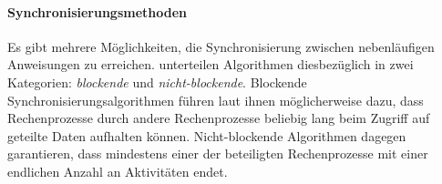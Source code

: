 \paragraph{Synchronisierungsmethoden} Es gibt mehrere Möglichkeiten, die Synchronisierung zwischen nebenläufigen Anweisungen zu erreichen. \textcite{Michael1996} unterteilen Algorithmen diesbezüglich in zwei Kategorien: \emph{blockende} und \emph{nicht-blockende}. Blockende Synchronisierungsalgorithmen führen laut ihnen möglicherweise dazu, dass Rechenprozesse durch andere Rechenprozesse beliebig lang beim Zugriff auf geteilte Daten aufhalten können. Nicht-blockende Algorithmen dagegen garantieren, dass mindestens einer der beteiligten Rechenprozesse mit einer endlichen Anzahl an Aktivitäten endet.

